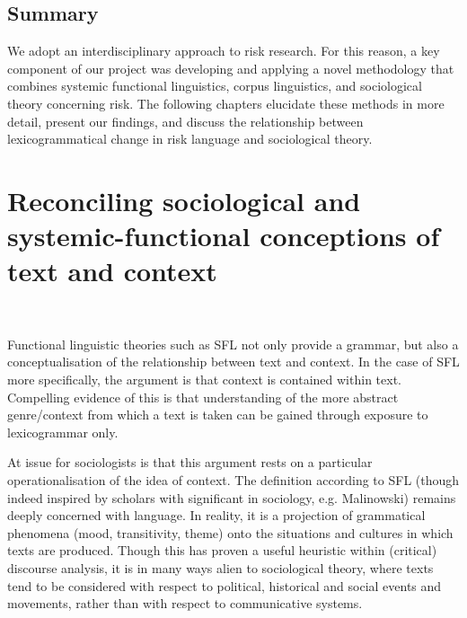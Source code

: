 \subsection{Summary}

We adopt an interdisciplinary approach to risk research. For this reason, a key component of our project was developing and applying a novel methodology that combines systemic functional linguistics, corpus linguistics, and sociological theory concerning risk. The following chapters elucidate these methods in more detail, present our findings, and discuss the relationship between lexicogrammatical change in risk language and sociological theory.










        
\section{Reconciling sociological and systemic-functional conceptions of text and context}

    
    ~\ 
    

    Functional linguistic theories such as SFL not only provide a grammar, but also a conceptualisation of the relationship between text and context. In the case of SFL more specifically, the argument is that context is contained within text. Compelling evidence of this is that understanding of the more abstract genre\slash context from which a text is taken can be gained through exposure to lexicogrammar only.

            At issue for sociologists is that this argument rests on a particular operationalisation of the idea of context. The definition according to SFL (though indeed inspired by scholars with significant in sociology, e.g. Malinowski) remains deeply concerned with language. In reality, it is a projection of grammatical phenomena (mood, transitivity, theme) onto the situations and cultures in which texts are produced. Though this has proven a useful heuristic within (critical) discourse analysis, it is in many ways alien to sociological theory, where texts tend to be considered with respect to political, historical and social events and movements, rather than with respect to communicative systems.

